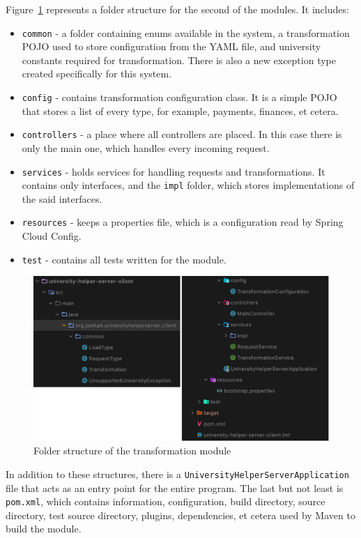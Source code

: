 Figure~\ref{fig:server-client-folder-structure} represents a folder structure for the second of the modules. It includes:
\begin{itemize}
    \item \texttt{common} - a folder containing enums available in the system, a transformation POJO used to store configuration from the YAML file, and university constants required for transformation. There is also a new exception type created specifically for this system.
    \item\texttt{config} - contains transformation configuration class. It is a simple POJO that stores a list of every type, for example, payments, finances, et cetera.
    \item \texttt{controllers} - a place where all controllers are placed. In this case there is only the main one, which handles every incoming request.
    \item \texttt{services} - holds services for handling requests and transformations. It contains only interfaces, and the \texttt{impl} folder, which stores implementations of the said interfaces.
    \item \texttt{resources} - keeps a properties file, which is a configuration read by Spring Cloud Config.
    \item \texttt{test} - contains all tests written for the module.
\end{itemize}

\begin{figure}[htb]
    \centering
    \includegraphics[width=.8\linewidth]{fig04/server-client-folder-structure.png}
    \caption{Folder structure of the transformation module}
    \label{fig:server-client-folder-structure}
\end{figure}

In addition to these structures, there is a \texttt{UniversityHelperServerApplication} file that acts as an entry point for the entire program. The last but not least is \texttt{pom.xml}, which contains information, configuration, build directory, source directory, test source directory, plugins, dependencies, et cetera used by Maven to build the module.

